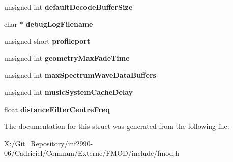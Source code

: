 \begin{DoxyCompactItemize}
\item 
\hypertarget{struct_f_m_o_d___a_d_v_a_n_c_e_d_s_e_t_t_i_n_g_s_a8b2d2802cd34875f10d319c8f363e399}{unsigned int {\bfseries default\-Decode\-Buffer\-Size}}\label{struct_f_m_o_d___a_d_v_a_n_c_e_d_s_e_t_t_i_n_g_s_a8b2d2802cd34875f10d319c8f363e399}

\item 
\hypertarget{struct_f_m_o_d___a_d_v_a_n_c_e_d_s_e_t_t_i_n_g_s_a00d10a918d3414c8f4bde3664f01b44f}{char $\ast$ {\bfseries debug\-Log\-Filename}}\label{struct_f_m_o_d___a_d_v_a_n_c_e_d_s_e_t_t_i_n_g_s_a00d10a918d3414c8f4bde3664f01b44f}

\item 
\hypertarget{struct_f_m_o_d___a_d_v_a_n_c_e_d_s_e_t_t_i_n_g_s_a5d12c84c6911facd30fcba7ab0dd7faa}{unsigned short {\bfseries profileport}}\label{struct_f_m_o_d___a_d_v_a_n_c_e_d_s_e_t_t_i_n_g_s_a5d12c84c6911facd30fcba7ab0dd7faa}

\item 
\hypertarget{struct_f_m_o_d___a_d_v_a_n_c_e_d_s_e_t_t_i_n_g_s_a973568fb1ec638193a0b0198d4165558}{unsigned int {\bfseries geometry\-Max\-Fade\-Time}}\label{struct_f_m_o_d___a_d_v_a_n_c_e_d_s_e_t_t_i_n_g_s_a973568fb1ec638193a0b0198d4165558}

\item 
\hypertarget{struct_f_m_o_d___a_d_v_a_n_c_e_d_s_e_t_t_i_n_g_s_a0404a31fe61b9d4e2340125a2a38a00d}{unsigned int {\bfseries max\-Spectrum\-Wave\-Data\-Buffers}}\label{struct_f_m_o_d___a_d_v_a_n_c_e_d_s_e_t_t_i_n_g_s_a0404a31fe61b9d4e2340125a2a38a00d}

\item 
\hypertarget{struct_f_m_o_d___a_d_v_a_n_c_e_d_s_e_t_t_i_n_g_s_abb66bb0cce280bd12f4092d2b3f642d1}{unsigned int {\bfseries music\-System\-Cache\-Delay}}\label{struct_f_m_o_d___a_d_v_a_n_c_e_d_s_e_t_t_i_n_g_s_abb66bb0cce280bd12f4092d2b3f642d1}

\item 
\hypertarget{struct_f_m_o_d___a_d_v_a_n_c_e_d_s_e_t_t_i_n_g_s_aec899d9cc69d0d664393d48f87dd9373}{float {\bfseries distance\-Filter\-Centre\-Freq}}\label{struct_f_m_o_d___a_d_v_a_n_c_e_d_s_e_t_t_i_n_g_s_aec899d9cc69d0d664393d48f87dd9373}

\end{DoxyCompactItemize}


The documentation for this struct was generated from the following file\-:\begin{DoxyCompactItemize}
\item 
X\-:/\-Git\-\_\-\-Repository/inf2990-\/06/\-Cadriciel/\-Commun/\-Externe/\-F\-M\-O\-D/include/fmod.\-h\end{DoxyCompactItemize}
